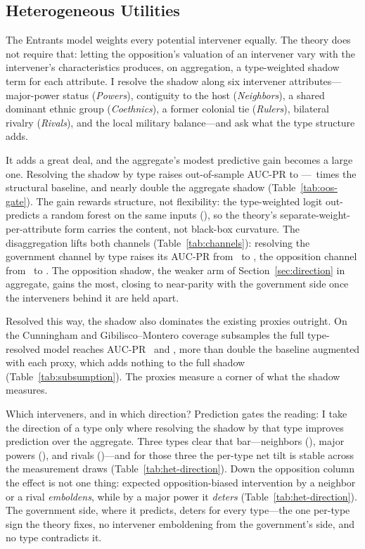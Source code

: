 

\subsection{Heterogeneous Utilities}
\label{sec:heterogeneity}

The Entrants model weights every potential intervener equally.  The theory does
not require that: letting the opposition's valuation of an intervener vary with
the intervener's characteristics produces, on aggregation, a type-weighted
shadow term for each attribute.  I resolve the shadow along six intervener
attributes---major-power status (\textit{Powers}), contiguity to the host
(\textit{Neighbors}), a shared dominant ethnic group (\textit{Coethnics}), a
former colonial tie (\textit{Rulers}), bilateral rivalry (\textit{Rivals}), and
the local military balance---and ask what the type structure adds.

It adds a great deal, and the aggregate's modest predictive gain becomes a
large one.  Resolving the shadow by type raises out-of-sample AUC-PR to
\OosFullAucpr---\OosFullLift\ times the structural baseline, and nearly double
the aggregate shadow (Table~\ref{tab:oos-gate}).  The gain rewards structure,
not flexibility: the type-weighted logit out-predicts a random forest on the
same inputs (\OosFullAucprRF), so the theory's separate-weight-per-attribute
form carries the content, not black-box curvature.  The disaggregation lifts
both channels (Table~\ref{tab:channels}): resolving the government channel by
type raises its AUC-PR from \ChanGovAgg\ to \ChanGovFull, the opposition channel
from \ChanOppAgg\ to \ChanOppFull.  The opposition shadow, the weaker arm of
Section~\ref{sec:direction} in aggregate, gains the most, closing to
near-parity with the government side once the interveners behind it are held
apart.

Resolved this way, the shadow also dominates the existing proxies outright.  On
the Cunningham and Gibilisco--Montero coverage subsamples the full type-resolved
model reaches AUC-PR \SubFullLake\ and \SubFullGM, more than double the
baseline augmented with each proxy, which adds nothing to the full shadow
(Table~\ref{tab:subsumption}).  The proxies measure a corner of what the shadow
measures.



Which interveners, and in which direction?  Prediction gates the reading: I take
the direction of a type only where resolving the shadow by that type improves
prediction over the aggregate.  Three types clear that bar---neighbors
(\HetNeighborsOos), major powers (\HetPowersOos), and rivals
(\HetRivalsOos)---and for those three the per-type net tilt is stable across the
measurement draws (Table~\ref{tab:het-direction}).  Down the opposition column
the effect is not one thing: expected opposition-biased intervention by a
neighbor or a rival \emph{emboldens}, while by a major power it \emph{deters}
(Table~\ref{tab:het-direction}).  The government side, where it predicts, deters
for every type---the one per-type sign the theory fixes, no intervener
emboldening from the government's side, and no type contradicts it.

